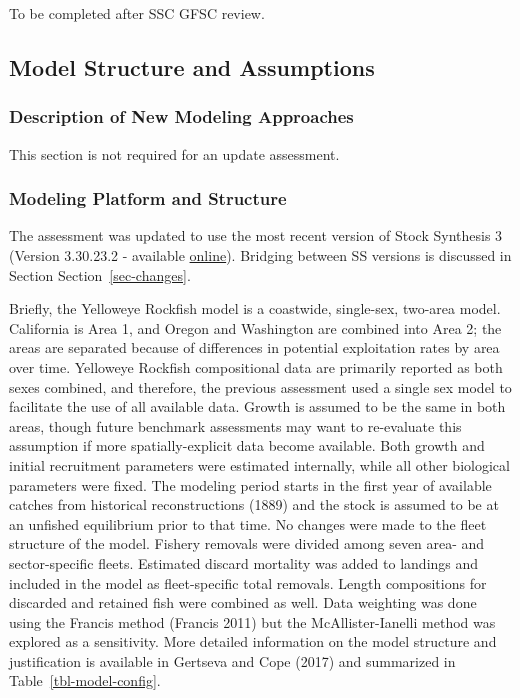 \documentclass[
]{scrartcl}
\begin{document}
To be completed after SSC GFSC review.

\subsection{Model Structure and Assumptions}\label{sec-bridge}

\subsubsection{Description of New Modeling
Approaches}\label{description-of-new-modeling-approaches}

This section is not required for an update assessment.

\subsubsection{Modeling Platform and
Structure}\label{modeling-platform-and-structure}

The assessment was updated to use the most recent version of Stock
Synthesis 3 (Version 3.30.23.2 - available
\href{https://github.com/nmfs-ost/ss3-source-code/releases/tag/v3.30.23.2}{online}).
Bridging between SS versions is discussed in Section
Section~\ref{sec-changes}.

Briefly, the Yelloweye Rockfish model is a coastwide, single-sex,
two-area model. California is Area 1, and Oregon and Washington are
combined into Area 2; the areas are separated because of differences in
potential exploitation rates by area over time. Yelloweye Rockfish
compositional data are primarily reported as both sexes combined, and
therefore, the previous assessment used a single sex model to facilitate
the use of all available data. Growth is assumed to be the same in both
areas, though future benchmark assessments may want to re-evaluate this
assumption if more spatially-explicit data become available. Both growth
and initial recruitment parameters were estimated internally, while all
other biological parameters were fixed. The modeling period starts in
the first year of available catches from historical reconstructions
(1889) and the stock is assumed to be at an unfished equilibrium prior
to that time. No changes were made to the fleet structure of the model.
Fishery removals were divided among seven area- and sector-specific
fleets. Estimated discard mortality was added to landings and included
in the model as fleet-specific total removals. Length compositions for
discarded and retained fish were combined as well. Data weighting was
done using the Francis method (Francis 2011) but the McAllister-Ianelli
method was explored as a sensitivity. More detailed information on the
model structure and justification is available in Gertseva and Cope
(2017) and summarized in Table~\ref{tbl-model-config}.
\end{document}
